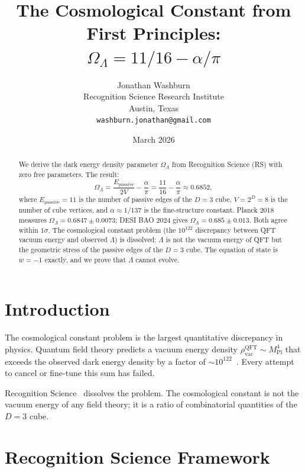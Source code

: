 \documentclass[12pt,a4paper]{article}
\title{The Cosmological Constant from First Principles:\\
$\Omega_\Lambda = 11/16 - \alpha/\pi$}
\author{Jonathan Washburn\\
Recognition Science Research Institute\\
Austin, Texas\\
\texttt{washburn.jonathan@gmail.com}}
\date{March 2026}
\theoremstyle{definition}
\theoremstyle{remark}
\begin{document}
\maketitle

\begin{abstract}
We derive the dark energy density parameter $\Omega_\Lambda$ from
Recognition Science (RS) with zero free parameters.  The result:
\begin{equation*}
  \Omega_\Lambda = \frac{E_{\mathrm{passive}}}{2V}
  - \frac{\alpha}{\pi}
  = \frac{11}{16} - \frac{\alpha}{\pi}
  \approx 0.6852,
\end{equation*}
where $E_{\mathrm{passive}} = 11$ is the number of passive edges
of the $D = 3$ cube, $V = 2^D = 8$ is the number of cube vertices,
and $\alpha \approx 1/137$ is the fine-structure constant.  Planck
2018 measures $\Omega_\Lambda = 0.6847 \pm 0.0073$; DESI BAO 2024
gives $\Omega_\Lambda = 0.685 \pm 0.013$.  Both agree within
$1\sigma$.  The cosmological constant problem (the $10^{122}$
discrepancy between QFT vacuum energy and observed $\Lambda$) is
dissolved: $\Lambda$ is not the vacuum energy of QFT but the
geometric stress of the passive edges of the $D = 3$ cube.  The
equation of state is $w = -1$ exactly, and we prove that $\Lambda$
cannot evolve.
\end{abstract}

\section{Introduction}
\label{sec:intro}

The cosmological constant problem is the largest quantitative
discrepancy in physics.  Quantum field theory predicts a vacuum
energy density $\rho_{\mathrm{vac}}^{\mathrm{QFT}} \sim
M_{\mathrm{Pl}}^4$ that exceeds the observed dark energy density
by a factor of $\sim 10^{122}$~\cite{Weinberg1989, Carroll2001}.
Every attempt to cancel or fine-tune this sum has failed.

Recognition Science~\cite{RS_Axioms} dissolves the problem.  The
cosmological constant is not the vacuum energy of any field theory;
it is a ratio of combinatorial quantities of the $D = 3$ cube.

\section{Recognition Science Framework}
\label{sec:framework}
\end{document}
